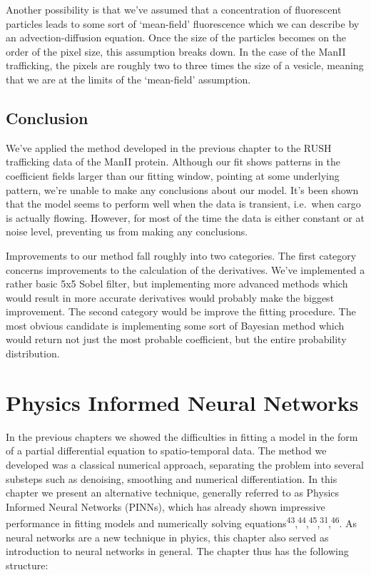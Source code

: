 \documentclass{Dissertate}
\begin{document}
Another possibility is that we've assumed that a concentration of
fluorescent particles leads to some sort of `mean-field' fluorescence
which we can describe by an advection-diffusion equation. Once the size
of the particles becomes on the order of the pixel size, this assumption
breaks down. In the case of the ManII trafficking, the pixels are
roughly two to three times the size of a vesicle, meaning that we are at
the limits of the `mean-field' assumption.

\hypertarget{conclusion}{%
\section{Conclusion}\label{conclusion}}

We've applied the method developed in the previous chapter to the RUSH
trafficking data of the ManII protein. Although our fit shows patterns
in the coefficient fields larger than our fitting window, pointing at
some underlying pattern, we're unable to make any conclusions about our
model. It's been shown that the model seems to perform well when the
data is transient, i.e.~when cargo is actually flowing. However, for
most of the time the data is either constant or at noise level,
preventing us from making any conclusions.

Improvements to our method fall roughly into two categories. The first
category concerns improvements to the calculation of the derivatives.
We've implemented a rather basic 5x5 Sobel filter, but implementing more
advanced methods which would result in more accurate derivatives would
probably make the biggest improvement. The second category would be
improve the fitting procedure. The most obvious candidate is
implementing some sort of Bayesian method which would return not just
the most probable coefficient, but the entire probability distribution.

\hypertarget{physics-informed-neural-networks}{%
\chapter{Physics Informed Neural
Networks}\label{physics-informed-neural-networks}}

In the previous chapters we showed the difficulties in fitting a model
in the form of a partial differential equation to spatio-temporal data.
The method we developed was a classical numerical approach, separating
the problem into several substeps such as denoising, smoothing and
numerical differentiation. In this chapter we present an alternative
technique, generally referred to as Physics Informed Neural Networks
(PINNs), which has already shown impressive performance in fitting
models and numerically solving
equations\textsuperscript{43},\textsuperscript{44},\textsuperscript{45},\textsuperscript{31},\textsuperscript{46}.
As neural networks are a new technique in phyics, this chapter also
served as introduction to neural networks in general. The chapter thus
has the following structure:
\end{document}
